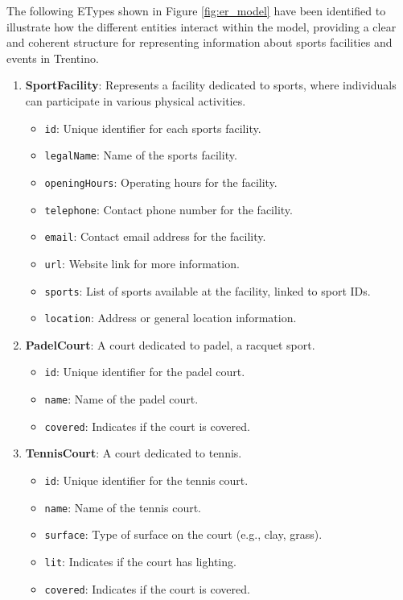 \noindent The following ETypes shown in Figure \ref{fig:er_model} have been identified to illustrate how the different entities interact within the model, providing a clear and coherent structure for representing information about sports facilities and events in Trentino.\begin{enumerate}
    \item \textbf{SportFacility}: Represents a facility dedicated to sports, where individuals can participate in various physical activities.
    \begin{itemize}
        \item \texttt{id}: Unique identifier for each sports facility.
        \item \texttt{legalName}: Name of the sports facility.
        \item \texttt{openingHours}: Operating hours for the facility.
        \item \texttt{telephone}: Contact phone number for the facility.
        \item \texttt{email}: Contact email address for the facility.
        \item \texttt{url}: Website link for more information.
        \item \texttt{sports}: List of sports available at the facility, linked to sport IDs.
        \item \texttt{location}: Address or general location information.      
    \end{itemize}

    \item \textbf{PadelCourt}: A court dedicated to padel, a racquet sport.
    \begin{itemize}
        \item \texttt{id}: Unique identifier for the padel court.
        \item \texttt{name}: Name of the padel court.
        \item \texttt{covered}: Indicates if the court is covered.
    \end{itemize}

    \item \textbf{TennisCourt}: A court dedicated to tennis.
    \begin{itemize}
        \item \texttt{id}: Unique identifier for the tennis court.
        \item \texttt{name}: Name of the tennis court.
        \item \texttt{surface}: Type of surface on the court (e.g., clay, grass).
        \item \texttt{lit}: Indicates if the court has lighting.
        \item \texttt{covered}: Indicates if the court is covered.
    \end{itemize}


\end{enumerate}
